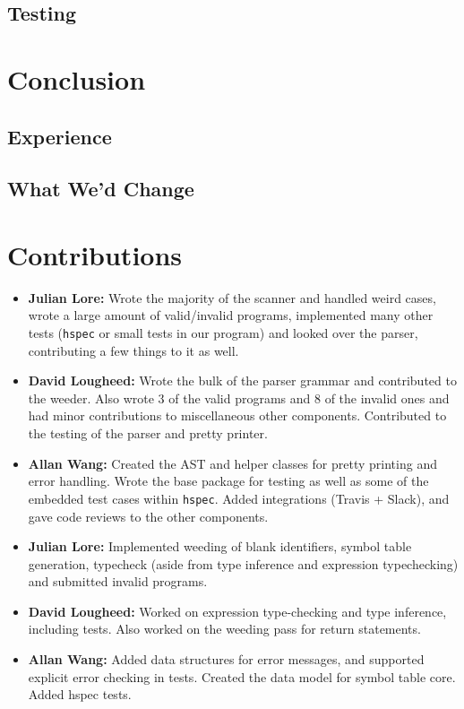 \documentclass[11pt]{article}
\begin{document}
\subsection{Testing}
\section{Conclusion}
\subsection{Experience}
\subsection{What We'd Change}
\section{Contributions}
\begin{itemize}
	\item \textbf{Julian Lore:} Wrote the majority of the scanner and handled weird
	      cases, wrote a large amount of valid/invalid programs, implemented
	      many other tests (\texttt{hspec} or small tests in our program) and looked
	      over the parser, contributing a few things to it as well.
	\item \textbf{David Lougheed:} Wrote the bulk of the parser grammar and contributed to
	      the weeder. Also wrote 3 of the valid programs and 8 of the
	      invalid ones and had minor contributions to miscellaneous other components.
	      Contributed to the testing of the parser and pretty printer.
	\item \textbf{Allan Wang:} Created the AST and helper classes for pretty printing
	      and error handling.  Wrote the base package for testing as well as
	      some of the embedded test cases within \texttt{hspec}.  Added integrations
	      (Travis + Slack), and gave code reviews to the other components.
\end{itemize}
\begin{itemize}
	\item \textbf{Julian Lore:} Implemented weeding of blank identifiers, symbol
	      table generation, typecheck (aside from type inference and
	      expression typechecking) and submitted invalid programs.
	\item \textbf{David Lougheed:} Worked on expression type-checking and type inference,
	      including tests. Also worked on the weeding pass for return
	      statements.
	\item \textbf{Allan Wang:} Added data structures for error messages, and supported
	      explicit error checking in tests. Created the data model for
	      symbol table core. Added hspec tests.
\end{itemize}
\end{document}
